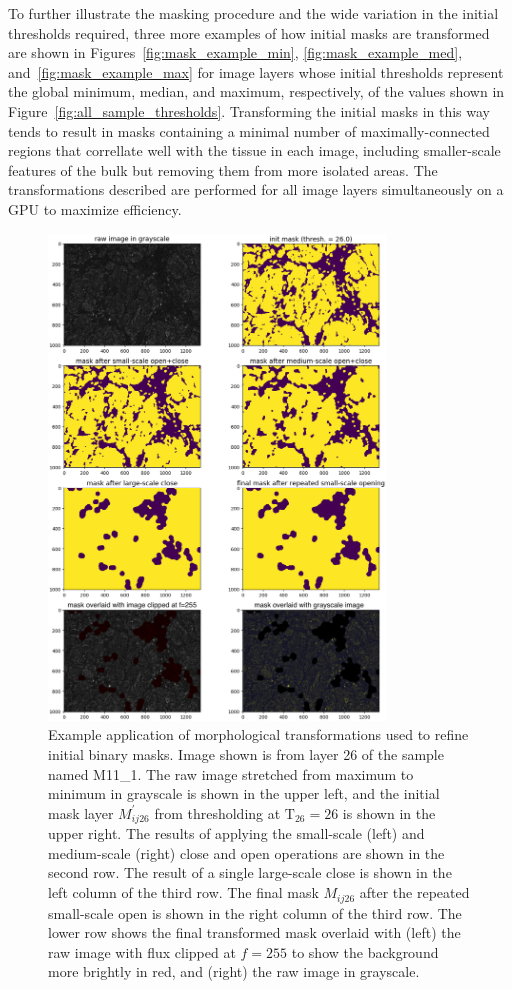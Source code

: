 \documentclass[letterpaper,11pt]{article}
\newcommand{\reffig}[1]{Figure~\ref{#1}}
\newcommand{\Tau}{\mathrm{T}}
\begin{document}
To further illustrate the masking procedure and the wide variation in the initial thresholds required, three more examples of how initial masks are transformed are shown in Figures~\ref{fig:mask_example_min}, \ref{fig:mask_example_med}, and~\ref{fig:mask_example_max} for image layers whose initial thresholds represent the global minimum, median, and maximum, respectively, of the values shown in \reffig{fig:all_sample_thresholds}. Transforming the initial masks in this way tends to result in masks containing a minimal number of maximally-connected regions that correllate well with the tissue in each image, including smaller-scale features of the bulk but removing them from more isolated areas. The transformations described are performed for all image layers simultaneously on a GPU to maximize efficiency. 

\begin{figure}[!ht]
\centering
\includegraphics[width=0.80\textwidth]{images/masking/image_110_layer_26_masks}
\caption{\footnotesize Example application of morphological transformations used to refine initial binary masks. Image shown is from layer 26 of the sample named M11\_1. The raw image stretched from maximum to minimum in grayscale is shown in the upper left, and the initial mask layer $M^{\prime}_{ij26}$ from thresholding at $\Tau_{26}=26$ is shown in the upper right. The results of applying the small-scale (left) and medium-scale (right) close and open operations are shown in the second row. The result of a single large-scale close is shown in the left column of the third row. The final mask $M_{ij26}$ after the repeated small-scale open is shown in the right column of the third row. The lower row shows the final transformed mask overlaid with (left) the raw image with flux clipped at $f=255$ to show the background more brightly in red, and (right) the raw image in grayscale.}

\end{figure}
\end{document}
